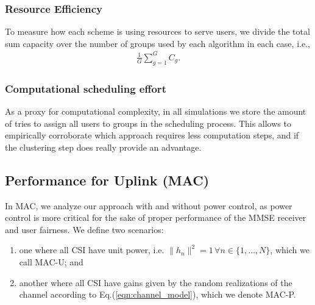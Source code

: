 \subsubsection{Resource Efficiency}
To measure how each scheme is using resources to serve users, we divide the total sum capacity over the number of groups used by each algorithm in each case, i.e.,
\begin{align}
	\frac{1}{G}\sum_{g=1}^G C_{g}.
\end{align}

\subsubsection{Computational scheduling effort}
As a proxy for computational complexity, in all simulations we store the amount of tries to assign all users to groups in the scheduling process. This allows to empirically corroborate which approach requires less computation steps, and if the clustering step does really provide an advantage.









\subsection{Performance for Uplink (MAC)}
In MAC, we analyze our approach with and without power control, as power control is more critical for the sake of proper performance of the MMSE receiver and user fairness. We define two scenarios:
\begin{enumerate}
	\item one where all CSI have unit power, i.e. $\|h_n\|^2=1\,\forall n\in\{1,\ldots,N\}$, which we call MAC-U; and
	\item another where all CSI have gains given by the random realizations of the channel according to Eq.(\ref{eqn:channel_model}), which we denote MAC-P.
\end{enumerate}




